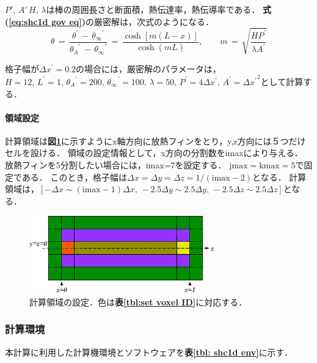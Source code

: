 \noindent $P',\,A'\,H,\,\lambda$は棒の周囲長さと断面積，熱伝達率，熱伝導率である．
\textbf{式(\ref{eq:shc1d gov eq})}の厳密解は，次式のようになる．
\begin{equation}
\theta
\,=\,
\frac{\theta^{\prime}\,-\,{\theta_{\infty}}^{\prime}} {{\theta_{A}}^{\prime}\,-\,{\theta_{\infty}}^{\prime}}
\,=\,
\frac{\cosh\left[{m\left({{L}{-}{x}}\right)}\right]}{\cosh\left({mL}\right)}{,}
\qquad m\,=\,\sqrt{\frac{H P^{\prime}}{\lambda A^{\prime}}}
\label{eq:1DHE exact solution}
\end{equation}


格子幅が$\Delta x^{\prime}=0.2$の場合には，厳密解のパラメータは，$H=12,\,L^{\prime}=1,\,{\theta_{A}}^{\prime}=200,\,{\theta_{\infty}}^{\prime}=100,\,\lambda=50,\,P^{\prime}=4\Delta x^{\prime},\,A^{\prime}={\Delta x^{\prime}}^2$として計算する．

\paragraph{領域設定}
計算領域は\textbf{図\ref{fig:shc1d dimension}}に示すようにx軸方向に放熱フィンをとり，y,z方向には５つだけセルを設ける．
領域の設定情報として，x方向の分割数をimaxにより与える．
放熱フィンを5分割したい場合には，imax=7を設定する．
$\mathrm{jmax=kmax=5}$で固定である．
このとき，格子幅は$\Delta x = \Delta y = \Delta z = 1\slash \mathrm{(imax-2)}$となる．
計算領域は，$[-\Delta x \sim (\mathrm{imax-1})\Delta x,\, -2.5\Delta y \sim 2.5\Delta y,\,-2.5\Delta z \sim 2.5\Delta z]$となる．

\begin{figure}[htdp]
\begin{center}
\includegraphics[width=8cm,clip]{dimension.eps}
\end{center}
\caption{計算領域の設定．色は\textbf{表\ref{tbl:set voxel ID}}に対応する．}
\label{fig:shc1d dimension}
\end{figure}

%
\pagebreak
\subsubsection{計算環境}
本計算に利用した計算機環境とソフトウェアを\textbf{表\ref{tbl: shc1d env}}に示す．

